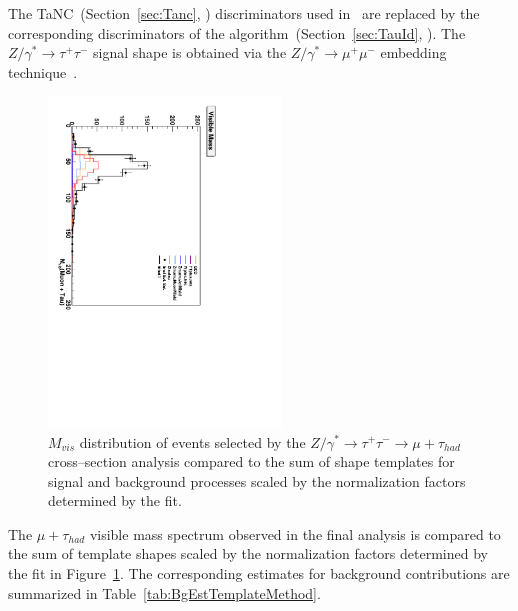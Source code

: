 The TaNC~(Section~\ref{sec:Tanc}, \cite{CMS_AN_2010-099}) discriminators used
in~\cite{CMS_AN_2011-021} are replaced by the corresponding discriminators of
the \hpsTanc algorithm~(Section~\ref{sec:TauId}, \cite{CMS_AN_2010-082}).  The
$Z/\gamma^{*} \to \tau^{+} \tau^{-}$ signal shape is obtained via the
$Z/\gamma^{*} \to \mu^{+} \mu^{-}$ embedding technique~\cite{MCEmbedding}.
\begin{figure}
\setlength{\unitlength}{1mm}
\begin{center}
\includegraphics*[width=62mm,
angle=90]{backgrounds_chapter/figures/fitBgEstTemplateZtoMuTau_visMass.pdf}
\caption[Visible mass distribution in the final fit of the Template
Method]{\captiontext $M_{vis}$ distribution of events selected by the
$Z/\gamma^{*} \rightarrow \tau^{+} \tau^{-} \rightarrow \mu + \tau_{had}$
cross--section analysis compared to the sum of shape templates for signal and
background processes scaled by the normalization factors determined by the fit.}
\label{fig:TemplateFitControlPlot}
\end{center}
\end{figure} 
The $\mu + \tau_{had}$ visible mass spectrum observed in the final analysis is
compared to the sum of template shapes scaled by the normalization factors
determined by the fit in Figure~\ref{fig:TemplateFitControlPlot}.  The
corresponding estimates for background contributions are summarized in
Table~\ref{tab:BgEstTemplateMethod}.


